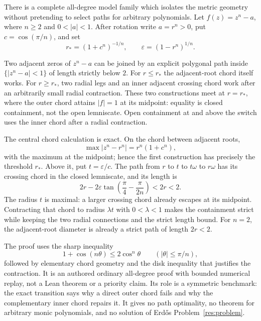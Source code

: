 \documentclass[11pt]{article}
\begin{document}

There is a complete all-degree model family which isolates the metric geometry
without pretending to select paths for arbitrary polynomials.  Let
$f(z)=z^n-a$, where $n\ge2$ and $0<|a|<1$.  After rotation write $a=r^n>0$,
put $c=\cos(\pi/n)$, and set
\[
 r_*=(1+c^n)^{-1/n},\qquad
 \varepsilon=(1-r^n)^{1/n}.
\]

\begin{theorem}
Two adjacent zeros of $z^n-a$ can be joined by an explicit polygonal path
inside $\{|z^n-a|<1\}$ of length strictly below $2$.  For $r\le r_*$ the
adjacent-root chord itself works.  For $r\ge r_*$, two radial legs and an
inner adjacent crossing chord work after an arbitrarily small radial
contraction.  These two constructions meet at $r=r_*$, where the outer chord attains
$|f|=1$ at its midpoint: equality is closed containment, not the open
lemniscate.  Open containment at and above the switch uses the inner chord
after a radial contraction.
\end{theorem}

The central chord calculation is exact.  On the chord between adjacent roots,
\[
 \max |z^n-r^n|=r^n(1+c^n),
\]
with the maximum at the midpoint; hence the first construction has precisely
the threshold $r_*$.  Above it, put $t=\varepsilon/c$.  The path from $r$ to
$t$ to $t\omega$ to $r\omega$ has its crossing chord in the closed
lemniscate, and its length is
\[
 2r-2\varepsilon\tan\!\left(\frac\pi4-\frac\pi{2n}\right)<2r<2.
\]
The radius $t$ is maximal: a larger crossing chord already escapes at its
midpoint.  Contracting that chord to radius $\lambda t$ with $0<\lambda<1$
makes the containment strict while keeping the two radial connections and the
strict length bound.  For $n=2$, the adjacent-root diameter is already a
strict path of length $2r<2$.

The proof uses the sharp inequality
\[
  1+\cos(n\theta)\le2\cos^n\theta
  \qquad (|\theta|\le\pi/n),
\]
followed by elementary chord geometry and the disk inequality that justifies
the contraction.  It is an authored ordinary all-degree proof with bounded
numerical replay, not a Lean theorem or a priority claim.  Its role is a
symmetric benchmark: the exact transition says why a direct outer chord fails
and why the complementary inner chord repairs it.  It gives no path
optimality, no theorem for arbitrary monic polynomials, and no solution of
Erd\H{o}s Problem~\ref{res:problem}.
\end{document}
